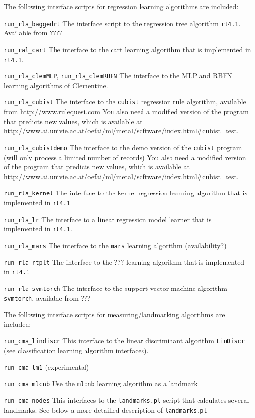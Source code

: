 \documentclass[a4paper,10pt,twoside]{article}
\newenvironment{optionlist}
{\begin{list}{}
    {\setlength{\itemsep}{0em plus0em minus0ex}
      \setlength{\parsep}{0ex}
      \setlength{\topsep}{0em}
      \setlength{\leftmargin}{2em}
      \setlength{\listparindent}{0em}
      \setlength{\itemindent}{-2em}
      \setlength{\partopsep}{0ex}
    }}
  {\end{list}}
\begin{document}
The following interface scripts for regression learning algorithms 
are included:

\begin{optionlist}
\item \verb=run_rla_baggedrt= The interface script to the regression
tree algorithm \texttt{rt4.1}. Available from ????
\item \verb=run_ral_cart= The interface to the cart learning algorithm
that is implemented in \texttt{rt4.1}.
\item \verb=run_rla_clemMLP=, \verb=run_rla_clemRBFN= The interface 
to the MLP and RBFN learning algorithms of Clementine. 
\item \verb=run_rla_cubist= The interface to the \texttt{cubist}
regression rule algorithm, available from \url{http://www.rulequest.com}
You also need a modified 
version of the program that predicts new values, which is
available at \url{http://www.ai.univie.ac.at/oefai/ml/metal/software/index.html#cubist_test}. 
\item \verb=run_rla_cubistdemo= The interface to the demo version of the 
\texttt{cubist} program (will only process a limited number of records)
You also need a modified 
version of the program that predicts new values, which is
available at \url{http://www.ai.univie.ac.at/oefai/ml/metal/software/index.html#cubist_test}. 
\item \verb=run_rla_kernel= The interface to the kernel regression
learning algorithm that is implemented in \texttt{rt4.1}
\item \verb=run_rla_lr= The interface to a linear regression model
learner that is implemented in \texttt{rt4.1}.
\item \verb=run_rla_mars= The interface to the \texttt{mars}
learning algorithm (availability?)
\item \verb=run_rla_rtplt= The interface to the ??? learning algorithm
that is implemented in \texttt{rt4.1}
\item \verb=run_rla_svmtorch= The interface to the support 
vector machine algorithm \texttt{svmtorch}, available from ???
\end{optionlist}

The following interface scripts for measuring/landmarking algorithms
are included:

\begin{optionlist}
\item \verb=run_cma_lindiscr= This interface to the linear discriminant
algorithm \texttt{LinDiscr} (see classification learning algorithm interfaces).
\item \verb=run_cma_lm1= (experimental)
\item \verb=run_cma_mlcnb= Use the \texttt{mlcnb} learning algorithm
as a landmark.
\item \verb=run_cma_nodes= This interfaces to the \texttt{landmarks.pl}
script that calculates several landmarks. See below a more detailled
description of \texttt{landmarks.pl}
\end{optionlist}
\end{document}
